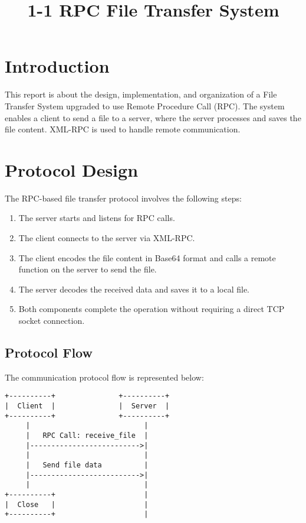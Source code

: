 \documentclass[a4paper,12pt]{article}
\title{\textbf{1-1 RPC File Transfer System}}
\author{}
\date{}
\begin{document}
\maketitle

\section*{Introduction}

This report is about the design, implementation, and organization of a File Transfer System upgraded to use Remote Procedure Call (RPC). The system enables a client to send a file to a server, where the server processes and saves the file content. XML-RPC is used to handle remote communication.

\section*{Protocol Design}
The RPC-based file transfer protocol involves the following steps:
\begin{enumerate}
    \item The server starts and listens for RPC calls.
    \item The client connects to the server via XML-RPC.
    \item The client encodes the file content in Base64 format and calls a remote function on the server to send the file.
    \item The server decodes the received data and saves it to a local file.
    \item Both components complete the operation without requiring a direct TCP socket connection.
\end{enumerate}

\subsection*{Protocol Flow}
The communication protocol flow is represented below:
\begin{verbatim}
+----------+               +----------+
|  Client  |               |  Server  |
+----------+               +----------+
     |                           |
     |   RPC Call: receive_file  |
     |-------------------------->|
     |                           |
     |   Send file data          |
     |-------------------------->|
     |                           |
+----------+                     |
|  Close   |                     |
+----------+                     |
\end{verbatim}
\end{document}
